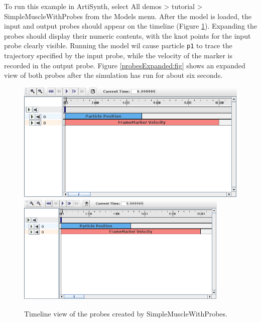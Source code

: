 To run this example in ArtiSynth, select {\sf All demos > tutorial >
SimpleMuscleWithProbes} from the {\sf Models} menu. After the model is
loaded, the input and output probes should appear on the timeline
(Figure \ref{probes:fig}). Expanding the probes should display their
numeric contents, with the knot points for the input probe clearly
visible.  Running the model wil cause particle {\tt p1} to trace the
trajectory specified by the input probe, while the velocity of the
marker is recorded in the output probe. Figure
\ref{probesExpanded:fig} shows an expanded view of both probes after
the simulation has run for about six seconds.

\begin{figure}[t]
\begin{center}
\iflatexml
 \includegraphics[]{images/timelineProbes}
\else
 \includegraphics[width=4in]{images/timelineProbes}
\fi
\end{center}
\caption{Timeline view of the probes created by SimpleMuscleWithProbes.}
\label{probes:fig}
\end{figure}

